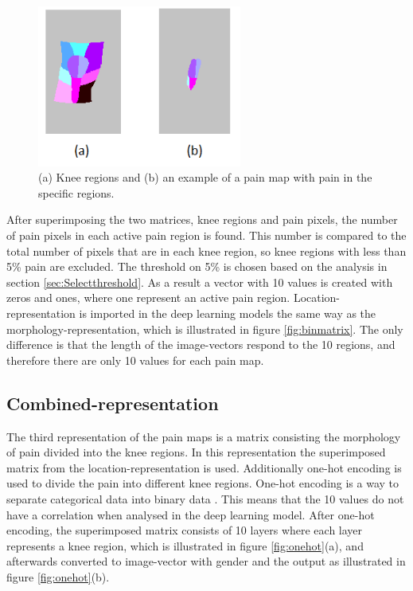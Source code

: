 \begin{figure} [H]
\centering
\includegraphics[width=0.6\textwidth]{figures/binregions}
\caption{(a) Knee regions and (b) an example of a pain map with pain in the specific regions.}
\label{fig:binregions}
\end{figure}

\noindent
After superimposing the two matrices, knee regions and pain pixels, the number of pain pixels in each active pain region is found. This number is compared to the total number of pixels that are in each knee region, so knee regions with less than 5\% pain are excluded. The threshold on 5\% is chosen based on the analysis in section \ref{sec:Selectthreshold}. As a result a vector with 10 values is created with zeros and ones, where one represent an active pain region. Location-representation is imported in the deep learning models the same way as the morphology-representation, which is illustrated in figure \ref{fig:binmatrix}. The only difference is that the length of the image-vectors respond to the 10 regions, and therefore there are only 10 values for each pain map.


\subsection{Combined-representation} \label{sec:combined}
The third representation of the pain maps is a matrix consisting the morphology of pain divided into the knee regions.
\noindent
In this representation the superimposed matrix from the location-representation is used. Additionally one-hot encoding is used to divide the pain into different knee regions. One-hot encoding is a way to separate categorical data into binary data \citep{Harris2012}. This means that the 10 values do not have a correlation when analysed in the deep learning model. After one-hot encoding, the superimposed matrix consists of 10 layers where each layer represents a knee region, which is illustrated in figure \ref{fig:onehot}(a), and afterwards converted to image-vector with gender and the output as illustrated in figure \ref{fig:onehot}(b).

